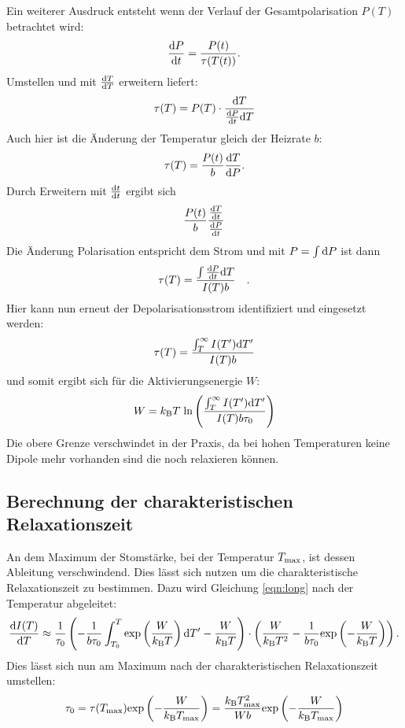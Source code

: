 				Ein weiterer Ausdruck entsteht wenn der Verlauf der Gesamtpolarisation $P(T)$ betrachtet wird:
				\begin{equation}
					\frac{\text{d} P}{\text{d} t} = \frac{P(t)}{\tau(T(t))}.
				\end{equation}
				Umstellen und mit $\frac{\text{d} T}{\text{d} T}$ erweitern liefert:
				\begin{equation}
					\tau(T) = P(T) \cdot \frac{\text{d}T}{\frac{\text{d} P}{\text{d} t}\text{d}T}
				\end{equation}
				Auch hier ist die Änderung der Temperatur gleich der Heizrate $b$:
				\begin{equation}
					\tau(T) = \frac{P(t)}{b}\frac{\text{d} T}{\text{d} P}.
				\end{equation}
				Durch Erweitern mit $\frac{\text{d} t}{\text{d} t}$ ergibt sich
				\begin{equation}
					\frac{P(t)}{b} \frac{\frac{\text{d} T}{\text{d} t}}{\frac{\text{d} P}{\text{d} t}}
				\end{equation}
				Die Änderung Polarisation entspricht dem Strom und mit $P = \int \text{d}P$ ist dann
				\begin{equation}
					\tau(T) = \frac{\int \frac{\text{d} P}{\text{d} t}\text{d}T}{I(T)b} \quad .
				\end{equation}
				Hier kann nun erneut der Depolarisationsstrom identifiziert und eingesetzt werden:
				\begin{equation}
					\tau(T) = \frac{\int_T^\infty I(T')\text{d}T'}{I(T)b}
				\end{equation}
				und somit ergibt sich für die Aktivierungsenergie $W$:
				\begin{equation}
					W = k_{\text{B}}T\;\text{ln}\left( \frac{\int_T^\infty I(T')\text{d}T'}{I(T)b\tau_0}\right)
					\label{eqn:int}
				\end{equation}
				Die obere Grenze verschwindet in der Praxis, da bei hohen Temperaturen keine Dipole mehr vorhanden sind die noch relaxieren können.

	\subsection{Berechnung der charakteristischen Relaxationszeit}
				
		An dem Maximum der Stomstärke, bei der Temperatur $T_{\text{max}}$, ist dessen Ableitung verschwindend. Dies lässt sich nutzen um die charakteristische Relaxationszeit zu bestimmen.
		Dazu wird Gleichung \ref{eqn:long} nach der Temperatur abgeleitet:
		\begin{equation}
			\frac{\text{d} I(T)}{\text{d} T} \approx \frac{1}{\tau_0} \left( - \frac{1}{b\tau_0}
			\int_{T_0}^T \text{exp}\left(\frac{W}{k_{\text{B}}T}\right)\text{d}T' - 
			\frac{W}{k_{\text{B}}T}\right) \cdot \left( \frac{W}{k_{\text{B}}T^2} - 
			\frac{1}{b\tau_0} 
			\text{exp}\left(-\frac{W}{k_{\text{B}}T}\right)\right).
		\end{equation}
		Dies lässt sich nun am Maximum nach der charakteristischen Relaxationszeit umstellen:
		\begin{equation}
			\tau_0 = \tau(T_{\text{max}})\text{exp}\left(- \frac{W}{k_{\text{B}}T_{\text{max}}}\right) = \frac{k_{\text{B}}T^2_{\text{max}}}{Wb}\text{exp}\left(-\frac{W}{k_{\text{B}}T_{\text{max}}}\right)
			\label{eqn:taumaxsource}
		\end{equation}

	
